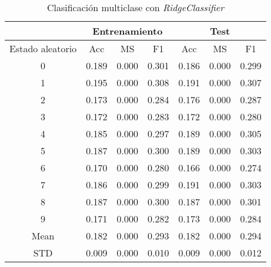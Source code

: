 \begin{table}[th]
	\centering
	\begin{tabular}{ |c|c|c|c|c|c|c| }
		\hline
		\rowcolor{LightCyan}
		 & \multicolumn{3}{c|}{Entrenamiento} & \multicolumn{3}{c|}{Test} \\
		\hline
		\rowcolor{LightCyan}
		 Estado aleatorio & Acc & MS & F1 & Acc & MS & F1 \\
		\hline
		0 & 0.189 & 0.000 & 0.301 & 0.186 & 0.000 & 0.299 \\
		1 & 0.195 & 0.000 & 0.308 & 0.191 & 0.000 & 0.307 \\
		2 & 0.173 & 0.000 & 0.284 & 0.176 & 0.000 & 0.287 \\
		3 & 0.172 & 0.000 & 0.283 & 0.172 & 0.000 & 0.280 \\
		4 & 0.185 & 0.000 & 0.297 & 0.189 & 0.000 & 0.305 \\
		5 & 0.187 & 0.000 & 0.300 & 0.189 & 0.000 & 0.303 \\
		6 & 0.170 & 0.000 & 0.280 & 0.166 & 0.000 & 0.274 \\
		7 & 0.186 & 0.000 & 0.299 & 0.191 & 0.000 & 0.303 \\
		8 & 0.187 & 0.000 & 0.300 & 0.187 & 0.000 & 0.301 \\
		9 & 0.171 & 0.000 & 0.282 & 0.173 & 0.000 & 0.284 \\
		Mean & 0.182 & 0.000 & 0.293 & 0.182 & 0.000 & 0.294 \\
		STD & 0.009 & 0.000 & 0.010 & 0.009 & 0.000 & 0.012 \\
		\hline
	\end{tabular}
	\caption{Clasificación multiclase con \textit{RidgeClassifier}}
	\label{tabla:ridge_multi}
\end{table}
